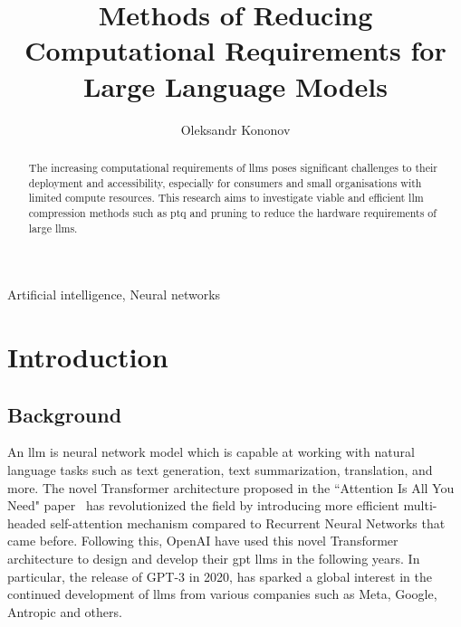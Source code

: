 \documentclass{ifacconf}
\begin{document}
	
	\begin{frontmatter}
		
		\title{Methods of Reducing Computational Requirements for Large Language Models} 
		
		\author[First]{Oleksandr Kononov} 
		
		\address[First]{South East Technological University, 
			Cork Road, Waterford, Ireland (e-mail: 20071032@mail.wit.ie).}
		\begin{abstract}                %
			The increasing computational requirements of \glspl{llm} poses significant challenges to their deployment and accessibility, especially for consumers and small organisations with limited compute resources. This research aims to investigate viable and efficient \gls{llm} compression methods such as \gls{ptq} and pruning to reduce the hardware requirements of large \glspl{llm}. 
		\end{abstract}
		
		\begin{keyword}
			Artificial intelligence, Neural networks
		\end{keyword}
		
	\end{frontmatter}
	\section{Introduction}
	\subsection{Background}
	An \gls{llm} is neural network model which is capable at working with natural language tasks such as text generation, text summarization, translation, and more. The novel Transformer architecture proposed in the ``Attention Is All You Need" paper~\cite{vaswani2017attentionneed} has revolutionized the field by introducing more efficient multi-headed self-attention mechanism compared to Recurrent Neural Networks that came before.
	Following this, OpenAI have used this novel Transformer architecture to design and develop their \gls{gpt} \glspl{llm} in the following years. In particular, the release of GPT-3 in 2020, has sparked a global interest in the continued development of \glspl{llm} from various companies such as Meta, Google, Antropic and others.
	
\end{document}
